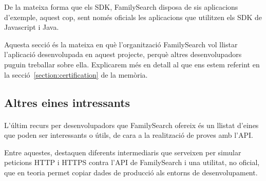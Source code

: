         De la mateixa forma que els SDK, FamilySearch disposa de sis aplicacions d'exem\-ple, aquest cop, sent només oficials les aplicacions que utilitzen els SDK de Javascript i Java.

        Aquesta secció és la mateixa en què l'organització FamilySearch vol llistar l'apli\-ca\-ció desenvolupada en aquest projecte, perquè altres desenvolupadors puguin treballar sobre ella. Explicarem més en detall al que ens estem referint en la secció~\ref{section:certification} de la memòria.


    \subsection{Altres eines intressants}

        \paragraph{}
        L'últim recurs per desenvolupadors que FamilySearch ofereix és un llistat d'eines que poden ser interessants o útils, de cara a la realització de proves amb l'API.

        Entre aquestes, destaquen diferents intermediaris que serveixen per simular peticions HTTP i HTTPS contra l'API de FamilySearch i una utilitat, no oficial, que en teoria permet copiar dades de producció als entorns de desenvolupament.

